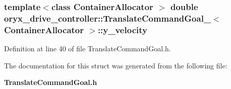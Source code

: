 \subsubsection[{y\-\_\-velocity}]{\setlength{\rightskip}{0pt plus 5cm}template$<$class Container\-Allocator $>$ double {\bf oryx\-\_\-drive\-\_\-controller\-::\-Translate\-Command\-Goal\-\_\-}$<$ \-Container\-Allocator $>$\-::{\bf y\-\_\-velocity}}\label{structoryx__drive__controller_1_1TranslateCommandGoal___a8cde2eabba1638a684fa0dfce22020a2}


\-Definition at line 40 of file \-Translate\-Command\-Goal.\-h.



\-The documentation for this struct was generated from the following file\-:\begin{DoxyCompactItemize}
\item 
{\bf \-Translate\-Command\-Goal.\-h}\end{DoxyCompactItemize}
